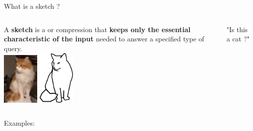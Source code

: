 \begin{frame}{What is a sketch ?}
    \begin{columns}
        A \textbf{sketch} is a  or  compression that \textbf{keeps only the essential characteristic of the input} needed to answer a specified type of query.\\
        \includegraphics[width=1.8cm]{pictures/photo_betisou.jpg}
        \hspace{0.5cm}
        \includegraphics[width=1.8cm]{pictures/betisou.png}\\
        \begin{center}
            "Is this a cat ?"
        \end{center}
    \end{columns}
    \pause

    {\Large Examples:}
    \medskip
    \begin{columns}
        {}
        {}
    \end{columns}
    
\end{frame}

